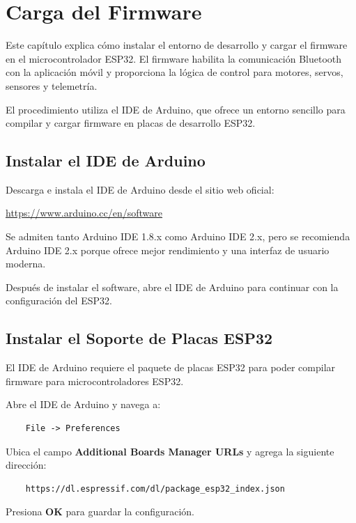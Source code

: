 \chapter{Carga del Firmware}

Este capítulo explica cómo instalar el entorno de desarrollo y cargar el firmware en el microcontrolador ESP32.
El firmware habilita la comunicación Bluetooth con la aplicación móvil y proporciona la lógica de control para
motores, servos, sensores y telemetría.

El procedimiento utiliza el IDE de Arduino, que ofrece un entorno sencillo para compilar y cargar firmware en
placas de desarrollo ESP32.

\section{Instalar el IDE de Arduino}

Descarga e instala el IDE de Arduino desde el sitio web oficial:

\begin{center}
    \url{https://www.arduino.cc/en/software}
\end{center}

Se admiten tanto Arduino IDE 1.8.x como Arduino IDE 2.x, pero se recomienda Arduino IDE 2.x porque ofrece mejor
rendimiento y una interfaz de usuario moderna.

Después de instalar el software, abre el IDE de Arduino para continuar con la configuración del ESP32.

\section{Instalar el Soporte de Placas ESP32}

El IDE de Arduino requiere el paquete de placas ESP32 para poder compilar firmware para microcontroladores ESP32.

Abre el IDE de Arduino y navega a:

\begin{verbatim}
    File -> Preferences
\end{verbatim}

Ubica el campo \textbf{Additional Boards Manager URLs} y agrega la siguiente dirección:

\begin{verbatim}
    https://dl.espressif.com/dl/package_esp32_index.json
\end{verbatim}

Presiona \textbf{OK} para guardar la configuración.

